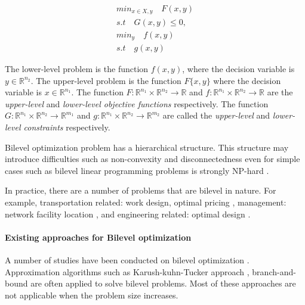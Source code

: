 \begin{subequations}
\label{eq:bilevel}
	\begin{align}
	min_{x \in X, y} 	\quad F(x, y) \\
	s.t 			\quad G(x, y) \leq 0, \\
	min_y			\quad f(x, y) \\
	s.t 			\quad g(x, y)
	\end{align}
\end{subequations}

The lower-level problem is the function $f(x, y)$, where the decision variable is $y \in \mathbb{R}^{n_2}$. The upper-level problem is the function $F\{x, y\}$ where the decision variable is $x \in \mathbb{R}^{n_1}$.
The function $F : \mathbb{R}^{n_1} \times  \mathbb{R}^{n_2} \to \mathbb{R}$ and $f : \mathbb{R}^{n_1} \times  \mathbb{R}^{n_2} \to \mathbb{R}$ are the \emph{upper-level} and \emph{lower-level objective functions} respectively. The function $G : \mathbb{R}^{n_1} \times  \mathbb{R}^{n_2} \to \mathbb{R}^{m_1}$ and $g : \mathbb{R}^{n_1} \times  \mathbb{R}^{n_2} \to \mathbb{R}^{m_2}$ are called the \emph{upper-level} and \emph{lower-level constraints} respectively. 

Bilevel optimization problem has a hierarchical structure. This structure may introduce difficulties such as non-convexity and disconnectedness even for simple cases such as bilevel linear programming problems is strongly NP-hard \cite{Sinha:2013tn}. 

In practice, there are a number of problems that are bilevel in nature. For example, transportation related: work design, optimal pricing \cite{Brotcorne:2001je, Constantin:1995hu}, management: network facility location \cite{Sun:2008gq},  and engineering related: optimal design \cite{KirjnerNeto:1998ef}. 




\paragraph{Existing approaches for Bilevel optimization}

A number of studies have been conducted on bilevel optimization \cite{Colson:2007bu,Dempe:2006jc}. Approximation algorithms such as Karush-kuhn-Tucker approach \cite{Bianco:2009ej, Herskovits:2000be}, branch-and-bound \cite{Bard:1982gsa} are often applied to solve bilevel problems. Most of these approaches are not applicable when the problem size increases.

